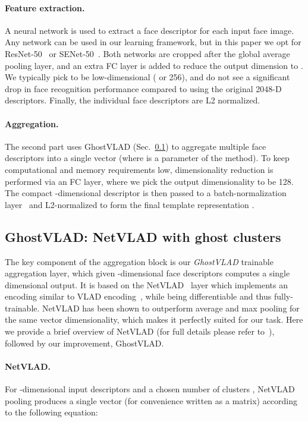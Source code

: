 \documentclass[runningheads]{llncs}
\begin{document}
\paragraph{Feature extraction.}
A neural network is used to extract
a face descriptor for each input face image.
Any network can be used in our learning framework,
but in this paper we opt for
ResNet-50~\cite{He16} or SENet-50~\cite{Hu18}.
Both networks are cropped 
after the global average pooling layer,
and an extra FC layer is added to reduce the 
output dimension to .
We typically pick  to be low-dimensional ( or 256),
and do not see
a significant drop in face recognition performance
compared to using the original 2048-D descriptors.
Finally, the individual face descriptors are L2 normalized.


\paragraph{Aggregation.}
The second part uses GhostVLAD (Sec.~\ref{sec:ghost})
to aggregate multiple face descriptors into a single
 vector (where  is a parameter of the method).
To keep computational and memory requirements low,
dimensionality reduction is performed via an FC layer,
where we pick the output dimensionality  to be 128.
The compact -dimensional
descriptor is then passed to a batch-normalization
layer~\cite{Ioffe15} and L2-normalized 
to form the final template 
representation .


\subsection{GhostVLAD: NetVLAD with ghost clusters} \label{sec:ghost}
The key component of the aggregation block is our \emph{GhostVLAD}
trainable aggregation layer, which given  -dimensional face descriptors computes a single  dimensional output.
It is based on the NetVLAD~\cite{Arandjelovic16} layer
which implements an encoding similar to 
VLAD encoding~\cite{Jegou10}, while being 
differentiable and thus fully-trainable.
NetVLAD  has been shown to outperform average and max pooling for the same
vector dimensionality, which makes
it perfectly suited for our task.
Here we provide a brief overview of NetVLAD
(for full details please refer to~\cite{Arandjelovic16}),
followed by our improvement, GhostVLAD.

\paragraph{NetVLAD.}
For  -dimensional input descriptors  and
a chosen number of clusters , NetVLAD pooling produces a single 
vector  (for convenience written as a  matrix) according
to the following equation:
\end{document}
